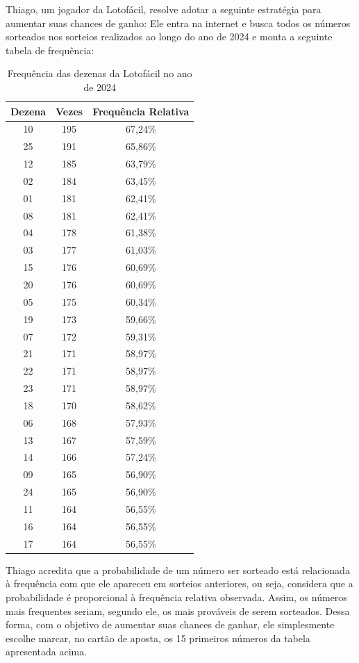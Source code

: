 \documentclass[12pt]{article}
\begin{document}
Thiago, um jogador da Lotofácil, resolve adotar a seguinte estratégia para aumentar suas chances de ganho: Ele entra na internet e busca todos os números sorteados
    nos sorteios realizados ao longo do ano de 2024 e monta a seguinte tabela de frequência:
\begin{table}[H]
\centering
\caption{Frequência das dezenas da Lotofácil no ano de 2024}
\begin{tabular}{|c|c|c|}
\hline
\textbf{Dezena} & \textbf{Vezes} & \textbf{Frequência Relativa} \\ \hline
10 & 195 & 67,24\% \\ \hline
25 & 191 & 65,86\% \\ \hline
12 & 185 & 63,79\% \\ \hline
02 & 184 & 63,45\% \\ \hline
01 & 181 & 62,41\% \\ \hline
08 & 181 & 62,41\% \\ \hline
04 & 178 & 61,38\% \\ \hline
03 & 177 & 61,03\% \\ \hline
15 & 176 & 60,69\% \\ \hline
20 & 176 & 60,69\% \\ \hline
05 & 175 & 60,34\% \\ \hline
19 & 173 & 59,66\% \\ \hline
07 & 172 & 59,31\% \\ \hline
21 & 171 & 58,97\% \\ \hline
22 & 171 & 58,97\% \\ \hline
23 & 171 & 58,97\% \\ \hline
18 & 170 & 58,62\% \\ \hline
06 & 168 & 57,93\% \\ \hline
13 & 167 & 57,59\% \\ \hline
14 & 166 & 57,24\% \\ \hline
09 & 165 & 56,90\% \\ \hline
24 & 165 & 56,90\% \\ \hline
11 & 164 & 56,55\% \\ \hline
16 & 164 & 56,55\% \\ \hline
17 & 164 & 56,55\% \\ \hline
\end{tabular}
\end{table}

Thiago acredita que a probabilidade de um número ser sorteado está relacionada à frequência com que ele apareceu em sorteios anteriores, ou seja, considera que a probabilidade é proporcional à frequência relativa observada. 
Assim, os números mais frequentes seriam, segundo ele, os mais prováveis de serem sorteados. Dessa forma, com o objetivo de aumentar suas chances de ganhar, ele simplesmente escolhe marcar, no cartão de aposta, os 15 primeiros números da tabela apresentada acima.
\end{document}
